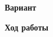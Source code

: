 \begin{center}
    \textbf{Вариант \LabVariant}
\end{center}



\begin{center}
    \textbf{Ход работы}
\end{center}

